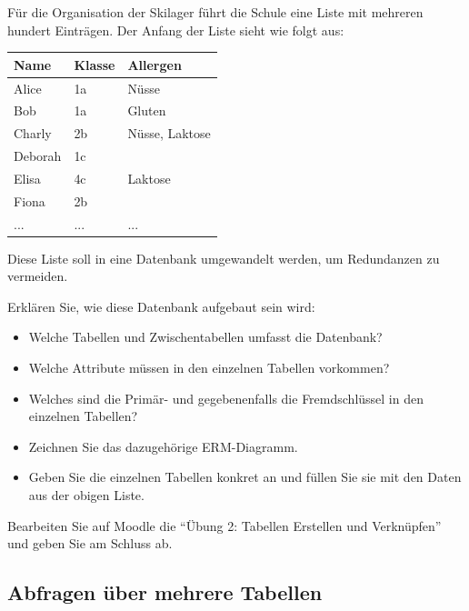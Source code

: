 \begin{myexercise}
  Für die Organisation der Skilager führt die Schule eine Liste mit mehreren hundert Einträgen. Der Anfang der Liste sieht wie folgt aus:

  \begin{tabular}{l|l|l}
    Name	& Klasse&	Allergen \\ \hline 
    Alice	&1a	&Nüsse \\
    Bob	&1a	&Gluten \\
    Charly	&2b	&Nüsse, Laktose \\
    Deborah	&1c&	 \\
    Elisa	&4c	&Laktose \\
    Fiona	&2b	& \\
    ...	&...	&...
  \end{tabular}


Diese Liste soll in eine Datenbank umgewandelt werden, um Redundanzen zu vermeiden.

Erklären Sie, wie diese Datenbank aufgebaut sein wird:

\begin{itemize}
  \item Welche Tabellen und Zwischentabellen umfasst die Datenbank?
  \item Welche Attribute müssen in den einzelnen Tabellen vorkommen?
  \item Welches sind die Primär- und gegebenenfalls die Fremdschlüssel in den einzelnen Tabellen?
  \item Zeichnen Sie das dazugehörige ERM-Diagramm.
  \item Geben Sie die einzelnen Tabellen konkret an und füllen Sie sie mit den Daten aus der obigen Liste.
\end{itemize}
\end{myexercise}


\begin{myexercise}
  Bearbeiten Sie auf Moodle die \enquote{Übung 2: Tabellen Erstellen und Verknüpfen} und geben Sie am Schluss ab.
\end{myexercise}


















\subsection{Abfragen über mehrere Tabellen}

